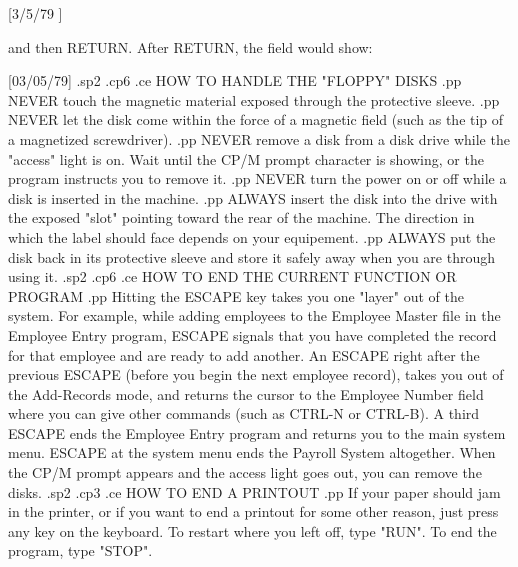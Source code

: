 		   [3/5/79  ]

	       and then RETURN.  After RETURN, the field
	       would show:

		   [03/05/79]
.sp2
.cp6
.ce
HOW TO HANDLE THE "FLOPPY" DISKS
.pp
NEVER touch the magnetic material exposed through the protective sleeve.
.pp
NEVER let the disk come within the force of a magnetic field (such as
the tip of a magnetized screwdriver).
.pp
NEVER remove a disk from a disk drive while the "access" light is on.
Wait until the CP/M prompt character is showing, or the program instructs
you to remove it.
.pp
NEVER turn the power on or off while a disk is inserted in the machine.
.pp
ALWAYS insert the disk into the drive with the exposed "slot" pointing
toward the rear of the machine.  The direction in which the label should
face depends on your equipement.
.pp
ALWAYS put the disk back in its protective sleeve and store it safely
away when you are through using it.
.sp2
.cp6
.ce
HOW TO END THE CURRENT FUNCTION OR PROGRAM
.pp
Hitting the ESCAPE key takes you one "layer" out of the system.  For
example, while adding employees to the Employee Master file in the
Employee Entry program, ESCAPE signals that you have completed the record
for that employee and are ready to add another.  An ESCAPE right after
the previous ESCAPE (before you begin the next employee
record), takes you out of the Add-Records mode, and returns the
cursor to the Employee Number field where you can give other commands
(such as CTRL-N or CTRL-B).  A third ESCAPE ends the Employee Entry
program and returns you to the main system menu.  ESCAPE at the system
menu ends the Payroll System altogether.  When the CP/M prompt appears
and the access light goes out, you can remove the disks.
.sp2
.cp3
.ce
HOW TO END A PRINTOUT
.pp
If your paper should jam in the printer, or if you want to end a
printout for some other reason, just press any key on the keyboard.
To restart where you left off, type "RUN".  To end the program, type
"STOP".

